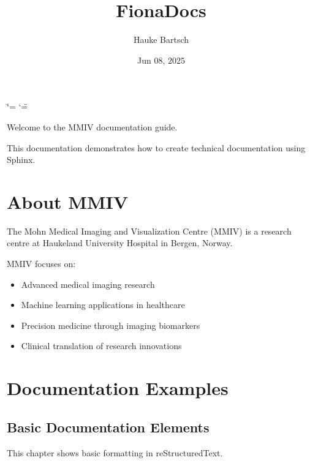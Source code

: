 \documentclass[letterpaper,10pt,english]{sphinxmanual}
\title{FionaDocs}
\date{Jun 08, 2025}
\author{Hauke Bartsch}
\begin{document}
\ifdefined\shorthandoff
  \ifnum\catcode`\=\string=\active\shorthandoff{=}\fi
  \ifnum\catcode`\"=\active{}\fi
\fi

\pagestyle{empty}
\sphinxmaketitle
\pagestyle{plain}
\sphinxtableofcontents
\pagestyle{normal}
\label{\detokenize{index::doc}}


\sphinxAtStartPar
Welcome to the MMIV documentation guide.

\sphinxAtStartPar
This documentation demonstrates how to create technical documentation using Sphinx.


\chapter{About MMIV}
\label{\detokenize{index:about-mmiv}}
\sphinxAtStartPar
The Mohn Medical Imaging and Visualization Centre (MMIV) is a research centre at Haukeland University Hospital in Bergen, Norway.

\sphinxAtStartPar
MMIV focuses on:
\begin{itemize}
\item {} 
\sphinxAtStartPar
Advanced medical imaging research

\item {} 
\sphinxAtStartPar
Machine learning applications in healthcare

\item {} 
\sphinxAtStartPar
Precision medicine through imaging biomarkers

\item {} 
\sphinxAtStartPar
Clinical translation of research innovations

\end{itemize}


\chapter{Documentation Examples}
\label{\detokenize{index:documentation-examples}}
\sphinxstepscope


\section{Basic Documentation Elements}
\label{\detokenize{basic-elements:basic-documentation-elements}}\label{\detokenize{basic-elements::doc}}
\sphinxAtStartPar
This chapter shows basic formatting in reStructuredText.
\end{document}
